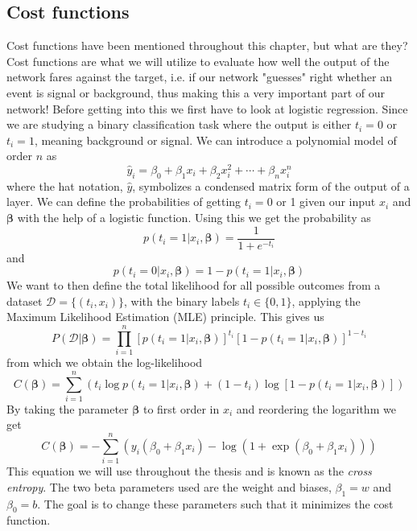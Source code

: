\documentclass[12pt, a4paper]{book}
\begin{document}
\subsection{Cost functions}\label{sec:cost_func}
Cost functions have been mentioned throughout this chapter, but what are they? Cost functions are what we will utilize to evaluate how well the output of the network fares against the target, i.e. if our network "guesses" right whether an event is signal or background, 
thus making this a very important part of our network! Before getting into this we first have to look at logistic regression. Since we are studying a binary classification task where the output is either $t_i=0$ or $t_i = 1$, meaning background or signal. 
We can introduce a polynomial model of order $n$ as
$$
\hat{y}_i=\beta_0+\beta_1x_i+\beta_2x_i^2+\cdots+\beta_nx_i^n
$$
where the hat notation, $\hat y$, symbolizes a condensed matrix form of the output of a layer. We can define the probabilities of getting $t_i=0$ or 1 given our input $x_i$ and $\bm{\beta}$ with the help of a logistic function. 
Using this we get the probability as
$$
p(t_i=1\vert x_i,\bm{\beta})=\frac{1}{1+e^{-t_i}}
$$
and
$$
p(t_i=0\vert x_i,\bm{\beta})=1- p(t_i=1\vert x_i,\bm{\beta})
$$
We want to then define the total likelihood for all possible outcomes from a dataset $\mathcal{D}=\{(t_i,x_i)\}$, with the binary labels $t_i\in\{0,1\}$, applying the Maximum Likelihood Estimation (MLE) principle. 
This gives us
$$
P(\mathcal{D}\vert\bm{\beta})=\prod_{i=1}^n\left[p(t_i=1\vert x_i,\bm{\beta})\right]^{t_i}\left[1-p(t_i=1\vert x_i,\bm{\beta})\right]^{1-t_i}
$$
from which we obtain the log-likelihood
$$
C(\bm{\beta})=\sum_{i=1}^n\left(t_i\log p(t_i=1\vert x_i,\bm{\beta})+(1-t_i)\log[1-p(t_i=1\vert x_i,\bm{\beta})]\right)
$$
By taking the parameter $\bm{\beta}$ to first order in $x_i$ and reordering the logarithm we get
\begin{equation}\label{eq:CrossEntropy}
    C(\bm{\beta})=-\sum_{i=1}^n(y_i(\beta_0+\beta_1x_i)-\log(1+\exp(\beta_0+\beta_1x_i)))
\end{equation}
This equation we will use throughout the thesis and is known as the \textit{cross entropy}. The two beta parameters used are the weight and biases, $\beta_1 = w$ and $\beta_0 = b$. The goal is to change these parameters such that it minimizes the cost function. 
\end{document}
